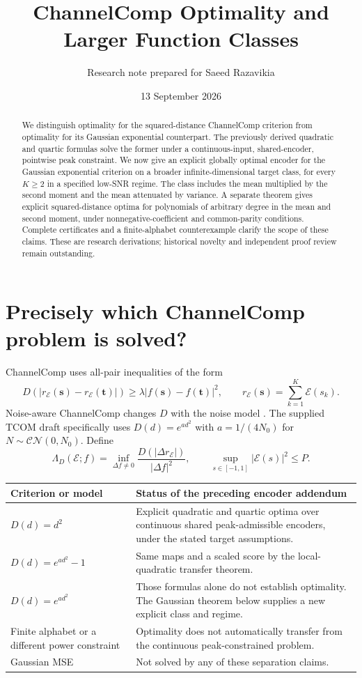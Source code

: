 \documentclass[11pt,letterpaper]{article}
\title{ChannelComp Optimality and Larger Function Classes}
\author{Research note prepared for Saeed Razavikia}
\date{13 September 2026}
\theoremstyle{remark}
\newcommand{\enc}{\mathscr E}
\begin{document}
\maketitle
\begin{abstract}
We distinguish optimality for the squared-distance ChannelComp criterion from optimality for its Gaussian exponential counterpart. The previously derived quadratic and quartic formulas solve the former under a continuous-input, shared-encoder, pointwise peak constraint. We now give an explicit globally optimal encoder for the Gaussian exponential criterion on a broader infinite-dimensional target class, for every $K\ge2$ in a specified low-SNR regime. The class includes the mean multiplied by the second moment and the mean attenuated by variance. A separate theorem gives explicit squared-distance optima for polynomials of arbitrary degree in the mean and second moment, under nonnegative-coefficient and common-parity conditions. Complete certificates and a finite-alphabet counterexample clarify the scope of these claims. These are research derivations; historical novelty and independent proof review remain outstanding.
\end{abstract}

\section{Precisely which ChannelComp problem is solved?}
ChannelComp uses all-pair inequalities of the form
$$
 D\!\left(|r_\enc(\mathbf s)-r_\enc(\mathbf t)|\right)
 \ge\lambda|f(\mathbf s)-f(\mathbf t)|^2,
 \qquad r_\enc(\mathbf s)=\sum_{k=1}^K\enc(s_k).
$$
Noise-aware ChannelComp changes $D$ with the noise model \cite{noiseaware}. The supplied TCOM draft specifically uses $D(d)=e^{ad^2}$ with $a=1/(4N_0)$ for $N\sim\mathcal{CN}(0,N_0)$. Define
\begin{equation}
 \Lambda_D(\enc;f)=\inf_{\Delta f\ne0}\frac{D(|\Delta r_\enc|)}{|\Delta f|^2},
 \qquad \sup_{s\in[-1,1]}|\enc(s)|^2\le P.
 \label{eq:score}
\end{equation}

\begin{center}
\small
\begin{tabular}{@{}p{}p{}@{}}
\toprule
Criterion or model & Status of the preceding encoder addendum\\
\midrule
$D(d)=d^2$ & Explicit quadratic and quartic optima over continuous shared peak-admissible encoders, under the stated target assumptions.\\[1mm]
$D(d)=e^{ad^2}-1$ & Same maps and a scaled score by the local-quadratic transfer theorem.\\[1mm]
$D(d)=e^{ad^2}$ & Those formulas alone do not establish optimality. The Gaussian theorem below supplies a new explicit class and regime.\\[1mm]
Finite alphabet or a different power constraint & Optimality does not automatically transfer from the continuous peak-constrained problem.\\[1mm]
Gaussian MSE & Not solved by any of these separation claims.\\
\bottomrule
\end{tabular}
\end{center}
\end{document}
